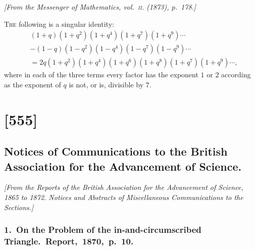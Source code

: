\documentclass[11pt,a4paper]{book}
\begin{document}
\begin{center}
\textit{[From the Messenger of Mathematics, vol.~\textsc{ii}. (1873), p.~178.]}
\end{center}

\textsc{The} following is a singular identity:
\begin{align*}
&(1 + q)(1 + q^2)(1 + q^4)(1 + q^7)(1 + q^9) \cdots \\
& - (1 - q)(1 - q^2)(1 - q^4)(1 - q^7)(1 - q^9) \cdots \\
& = 2q(1 + q^2)(1 + q^4)(1 + q^6)(1 + q^8)(1 + q^7)(1 + q^9) \cdots,
\end{align*}
where in each of the three terms every factor has the exponent $1$ or $2$ according as
the exponent of $q$ is not, or is, divisible by $7$.

\clearpage

\section{[555]}
\subsection{Notices of Communications to the British Association for the Advancement of Science.}

\begin{center}
\textit{[From the Reports of the British Association for the Advancement of Science, 1865 to 1872. Notices and Abstracts of Miscellaneous Communications to the Sections.]}
\end{center}

\subsubsection*{1.\ On the Problem of the in-and-circumscribed Triangle.\ Report,\ 1870,\ p.\ 10.}
\end{document}

